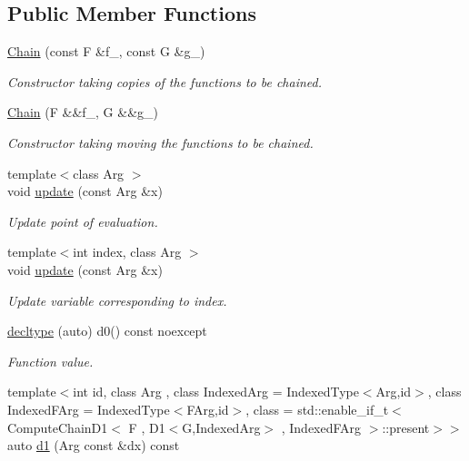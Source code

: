 \subsection*{\-Public \-Member \-Functions}
\begin{DoxyCompactItemize}
\item 
\hyperlink{structFunG_1_1MathematicalOperations_1_1Chain_a3167b6304026eb0bd92e57d0dd0087e0}{\-Chain} (const \-F \&f\-\_\-, const \-G \&g\-\_\-)
\begin{DoxyCompactList}\small\item\em \-Constructor taking copies of the functions to be chained. \end{DoxyCompactList}\item 
\hyperlink{structFunG_1_1MathematicalOperations_1_1Chain_a0c5cc51c17c31db3754edc016a745201}{\-Chain} (\-F \&\&f\-\_\-, \-G \&\&g\-\_\-)
\begin{DoxyCompactList}\small\item\em \-Constructor taking moving the functions to be chained. \end{DoxyCompactList}\item 
{\footnotesize template$<$class Arg $>$ }\\void \hyperlink{structFunG_1_1MathematicalOperations_1_1Chain_adb7f63859ef7dbdd08b0908c3a17794d}{update} (const \-Arg \&x)
\begin{DoxyCompactList}\small\item\em \-Update point of evaluation. \end{DoxyCompactList}\item 
{\footnotesize template$<$int index, class Arg $>$ }\\void \hyperlink{structFunG_1_1MathematicalOperations_1_1Chain_aa41d754e68072e0a9f1460da79f9913e}{update} (const \-Arg \&x)
\begin{DoxyCompactList}\small\item\em \-Update variable corresponding to index. \end{DoxyCompactList}\item 
\hyperlink{structFunG_1_1MathematicalOperations_1_1Chain_ad9975c8fee7fd43d5e7c2d9a474dcb33}{decltype} (auto) d0() const noexcept
\begin{DoxyCompactList}\small\item\em \-Function value. \end{DoxyCompactList}\item 
{\footnotesize template$<$int id, class Arg , class Indexed\-Arg  = \-Indexed\-Type$<$\-Arg,id$>$, class Indexed\-F\-Arg  = \-Indexed\-Type$<$\-F\-Arg,id$>$, class  = std\-::enable\-\_\-if\-\_\-t$<$ Compute\-Chain\-D1$<$ F , D1$<$\-G,\-Indexed\-Arg$>$ , Indexed\-F\-Arg $>$\-::present$>$$>$ }\\auto \hyperlink{structFunG_1_1MathematicalOperations_1_1Chain_adfe741dee89257258b39df846fd16cf7}{d1} (\-Arg const \&dx) const 

\end{DoxyCompactItemize}
